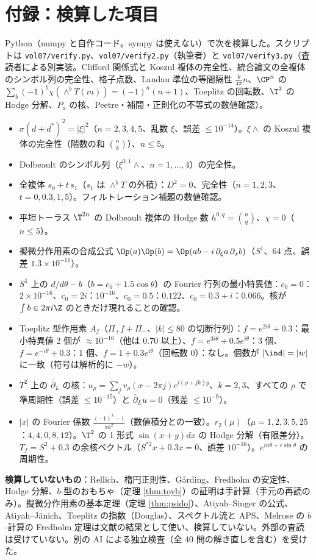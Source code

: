 \section*{付録：検算した項目}
Python（numpy と自作コード。sympy は使えない）で次を検算した。スクリプトは \texttt{vol07/verify.py}、\texttt{vol07/verify2.py}（執筆者）と \texttt{vol07/verify3.py}（査読者による別実装。Clifford 関係式と Koszul 複体の完全性、統合論文の全複体のシンボル列の完全性、格子点数、Landau 準位の等間隔性 $\frac{k}{4\pi}n$、$\CP^n$ の $\sum_b(-1)^b\chi(\wedge^bT(m))=(-1)^n(n+1)$、Toeplitz の回転数、$\T^2$ の Hodge 分解、$P_a$ の核、Peetre・補間・正則化の不等式の数値確認）。
\begin{itemize}
\item $\sigma(d+d^*)^2=|\xi|^2$（$n=2,3,4,5$、乱数 $\xi$、誤差 $\le10^{-14}$）。$\xi\wedge$ の Koszul 複体の完全性（階数の和 $\binom nk$）、$n\le5$。
\item Dolbeault のシンボル列（$\xi^{0,1}\wedge$、$n=1,\dots,4$）の完全性。
\item 全複体 $s_0+t\,s_1$（$s_1$ は $\wedge^bT$ の外積）：$D^2=0$、完全性（$n=1,2,3$、$t=0,0.3,1,5$）。フィルトレーション補題の数値確認。
\item 平坦トーラス $\T^{2n}$ の Dolbeault 複体の Hodge 数 $h^{0,q}=\binom nq$、$\chi=0$（$n\le5$）。
\item 擬微分作用素の合成公式 $\Op(a)\Op(b)=\Op(ab-i\,\partial_\xi a\,\partial_xb)$（$S^1$、64 点、誤差 $1.3\times10^{-11}$）。
\item $S^1$ 上の $d/d\theta-b$（$b=c_0+1.5\cos\theta$）の Fourier 行列の最小特異値：$c_0=0$：$2\times10^{-16}$、$c_0=2i$：$10^{-16}$、$c_0=0.5$：$0.122$、$c_0=0.3+i$：$0.066$。核が $\int b\in2\pi i\Z$ のときだけ現れることの確認。
\item Toeplitz 型作用素 $A_f$（$\Pi_+f+\Pi_-$、$|k|\le80$ の切断行列）：$f=e^{2i\theta}+0.3$：最小特異値 2 個が $\approx10^{-16}$（他は $0.70$ 以上）、$f=e^{3i\theta}+0.5e^{i\theta}$：3 個、$f=e^{-i\theta}+0.3$：1 個、$f=1+0.3e^{i\theta}$（回転数 $0$）：なし。個数が $|\ind|=|w|$ に一致（符号は解析的に $-w$）。
\item $T^2$ 上の $\bar\partial_L$ の核：$u_\rho=\sum_jv_\rho(x-2\pi j)e^{i(\rho+jk)y}$、$k=2,3$、すべての $\rho$ で準周期性（誤差 $\le10^{-15}$）と $\bar\partial_Lu=0$（残差 $\le10^{-9}$）。
\item $|x|$ の Fourier 係数 $\frac{(-1)^k-1}{\pi k^2}$（数値積分との一致）。$r_2(\mu)$（$\mu=1,2,3,5,25$：$4,4,0,8,12$）。$\T^2$ の 1 形式 $\sin(x+y)dx$ の Hodge 分解（有限差分）。$T_f=S^2+0.3$ の余核ベクトル（$S^{*2}x+0.3x=0$、誤差 $10^{-16}$）。$e^{in\theta+\varepsilon\sin\theta}$ の周期性。
\end{itemize}
\textbf{検算していないもの}：Rellich、楕円正則性、Gårding、Fredholm の安定性、Hodge 分解、$b$-型のおもちゃ（定理 \ref{thm:toyb}）の証明は手計算（手元の再読のみ）。擬微分作用素の基本定理（定理 \ref{thm:psido}）、Atiyah--Singer の公式、Atiyah--Jänich、Toeplitz の指数（Douglas）、スペクトル流と APS、Melrose の $b$-計算の Fredholm 定理は文献の結果として使い、検算していない。外部の査読は受けていない。別の AI による独立検査（全 40 問の解き直しを含む）を受けた。

